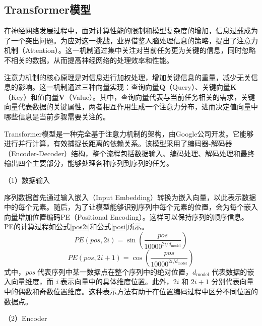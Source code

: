 \subsection{Transformer模型}
在神经网络发展过程中，面对计算性能的限制和模型复杂度的增加，信息过载成为了一个突出问题。为应对这一挑战，业界借鉴人脑处理信息的策略，提出了注意力机制（Attention）。这一机制通过集中关注对当前任务更为关键的信息，同时忽略不相关的数据，从而提高神经网络的处理效率和性能。

注意力机制的核心原理是对信息进行加权处理，增加关键信息的重量，减少无关信息的影响。这一机制通过三种向量实现：查询向量$\mathbf{Q}$（Query）、关键向量$\mathbf{K}$（Key）和值向量$\mathbf{V}$（Value）。其中，查询向量代表与当前任务相关的需求，关键向量代表数据的关键属性，两者相互作用生成一个注意力分布，进而决定值向量中哪些信息是当前步骤需要关注的。

Transformer模型是一种完全基于注意力机制的架构，由Google公司开发\cite{vaswani2023attention}。它能够进行并行计算，有效捕捉长距离的依赖关系。该模型采用了编码器-解码器（Encoder-Decoder）结构，整个流程包括数据输入、编码处理、解码处理和最终输出四个主要部分，能够处理各种序列到序列的任务。

（1）数据输入

序列数据首先通过输入嵌入（Input Embedding）转换为嵌入向量，以此表示数据中的每个元素。随后，为了让模型能够识别序列中每个元素的位置，会为每个嵌入向量增加位置编码PE（Positional Encoding）。这样可以保持序列的顺序信息。
PE的计算过程如公式\eqref{pos2i}和公式\eqref{posi}所示。
\begin{equation}
    PE(pos, 2i) = \sin\left(\frac{pos}{10000^{2i/d_{\text{model}}}}\right)
    \label{pos2i}
\end{equation}
\begin{equation}
    PE(pos, 2i+1) = \cos\left(\frac{pos}{10000^{2i/d_{\text{model}}}}\right)
    \label{posi}
\end{equation}
式中，\textit{pos} 代表序列中某一数据点在整个序列中的绝对位置，\(d_{\text{model}}\) 代表数据的嵌入向量维度，而 \textit{i} 表示向量中的具体维度位置。此外，\(2i\) 和 \(2i + 1\) 分别代表向量中的偶数和奇数位置维度。这种表示方法有助于在位置编码过程中区分不同位置的数据点。

（2）Encoder

